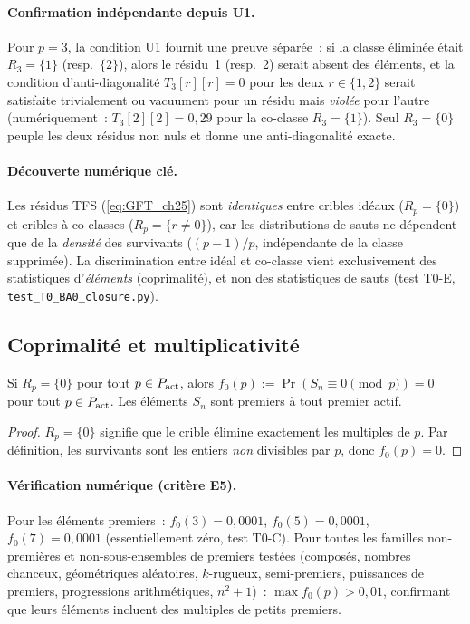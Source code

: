 \documentclass[12pt,a4paper]{article}
\begin{document}
\paragraph{Confirmation indépendante depuis U1.}
Pour $p = 3$, la condition U1 fournit une preuve séparée~: si la
classe éliminée était $R_3 = \{1\}$ (resp.\ $\{2\}$), alors le
résidu~1 (resp.~2) serait absent des éléments, et la condition
d'anti-diagonalité $T_3[r][r] = 0$ pour les deux $r \in \{1, 2\}$
serait satisfaite trivialement ou vacuument pour un résidu mais
\emph{violée} pour l'autre (numériquement~: $T_3[2][2] = 0{,}29$
pour la co-classe $R_3 = \{1\}$). Seul $R_3 = \{0\}$ peuple les
deux résidus non nuls et donne une anti-diagonalité exacte.

\paragraph{Découverte numérique clé.}
Les résidus TFS (\cref{eq:GFT_ch25}) sont \emph{identiques} entre
cribles idéaux ($R_p = \{0\}$) et cribles à co-classes
($R_p = \{r \neq 0\}$), car les distributions de sauts ne dépendent
que de la \emph{densité} des survivants ($(p-1)/p$, indépendante
de la classe supprimée). La discrimination entre idéal et co-classe
vient exclusivement des statistiques d'\emph{éléments}
(coprimalité), et non des statistiques de sauts (test T0-E,
\texttt{test\_T0\_BA0\_closure.py}).

\subsection{Coprimalité et multiplicativité}
\label{sec:ch25_coprimality}

\begin{lemme}[Coprimalité]
\label{lem:coprimality}
Si $R_p = \{0\}$ pour tout $p \in P_{\rm act}$, alors
$f_0(p) := \Pr(S_n \equiv 0 \pmod{p}) = 0$ pour tout
$p \in P_{\rm act}$. Les éléments $S_n$ sont premiers à tout
premier actif.
\end{lemme}

\begin{proof}
$R_p = \{0\}$ signifie que le crible élimine exactement les
multiples de $p$. Par définition, les survivants sont les entiers
\emph{non} divisibles par $p$, donc $f_0(p) = 0$.
\end{proof}

\paragraph{Vérification numérique (critère E5).}
Pour les éléments premiers~: $f_0(3) = 0{,}0001$,
$f_0(5) = 0{,}0001$, $f_0(7) = 0{,}0001$ (essentiellement zéro,
test T0-C). Pour toutes les familles non-premières et non-sous-ensembles
de premiers testées (composés, nombres chanceux, géométriques
aléatoires, $k$-rugueux, semi-premiers, puissances de premiers,
progressions arithmétiques, $n^2+1$)~: $\max f_0(p) > 0{,}01$,
confirmant que leurs éléments incluent des multiples de petits
premiers.
\end{document}
